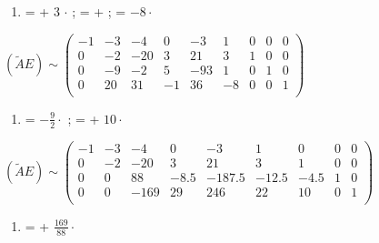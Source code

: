 \documentclass[10pt, a4paper]{scrartcl}
\begin{document}
\begin{enumerate}
\def\labelenumi{\arabic{enumi})}
\itemsep1pt\parskip0pt
\item
  \uppercase\expandafter{} =
  \uppercase\expandafter{} + 3 \(\cdot\)
  \uppercase\expandafter{};
  \uppercase\expandafter{} =
  \uppercase\expandafter{} +
  \uppercase\expandafter{};
  \uppercase\expandafter{} =
  \uppercase\expandafter{}\(- 8 \cdot\)
  \uppercase\expandafter{}
\end{enumerate}

\(\displaystyle (\widetilde{A}E) \sim \begin{pmatrix} -1 & -3 & -4 & 0 & -3 & 1 & 0 & 0 & 0\\ 0 & -2 & -20 & 3 & 21 & 3 & 1 & 0 & 0\\ 0 & -9 & -2 & 5 & -93 & 1 & 0 & 1 & 0\\ 0 & 20 & 31 & -1 & 36 & -8 & 0 & 0 & 1\\ \end{pmatrix}\)

\begin{enumerate}
\def\labelenumi{\arabic{enumi})}
\setcounter{enumi}{1}
\itemsep1pt\parskip0pt
\item
  \uppercase\expandafter{} =
  \uppercase\expandafter{} \(- \frac{9}{2} \cdot\)
  \uppercase\expandafter{};
  \uppercase\expandafter{} =
  \uppercase\expandafter{} +
  \(10 \cdot\)\uppercase\expandafter{}
\end{enumerate}

\(\displaystyle (\widetilde{A}E) \sim \begin{pmatrix} -1 & -3 & -4 & 0 & -3 & 1 & 0 & 0 & 0\\ 0 & -2 & -20 & 3 & 21 & 3 & 1 & 0 & 0\\ 0 & 0 & 88 & -8.5 & -187.5 & -12.5 & -4.5 & 1 & 0\\ 0 & 0 & -169 & 29 & 246 & 22 & 10 & 0 & 1\\ \end{pmatrix}\)

\begin{enumerate}
\def\labelenumi{\arabic{enumi})}
\setcounter{enumi}{2}
\itemsep1pt\parskip0pt
\item
  \uppercase\expandafter{} =
  \uppercase\expandafter{} +
  \(\frac{169}{88} \cdot\)\uppercase\expandafter{}
\end{enumerate}
\end{document}
